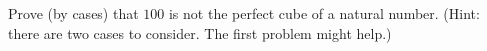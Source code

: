 Prove (by cases) that $100$ is not the perfect cube of a natural number. (Hint: there are two cases to consider. The first problem might help.)